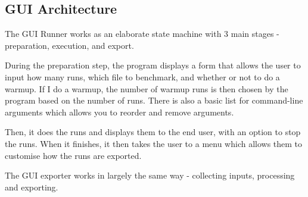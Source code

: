 \documentclass{article}
\begin{document}
\begin{multicols*}{2}
\subsection{GUI Architecture}
The GUI Runner works as an elaborate state machine with 3 main stages - preparation, execution, and export.

During the preparation step, the program displays a form that allows the user to input how many runs, which file to benchmark, and whether or not to do a warmup. If I do a warmup, the number of warmup runs is then chosen by the program based on the number of runs. There is also a basic list for command-line arguments which allows you to reorder and remove arguments.

Then, it does the runs and displays them to the end user, with an option to stop the runs. When it finishes, it then takes the user to a menu which allows them to customise how the runs are exported.

The GUI exporter works in largely the same way - collecting inputs, processing and exporting.

\end{multicols*}
\newpage
\end{document}
